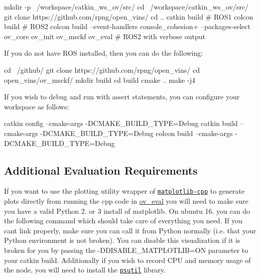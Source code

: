 \begin{DoxyCode}
mkdir -p ~/workspace/catkin\_ws\_ov/src/
cd ~/workspace/catkin\_ws\_ov/src/
git clone https://github.com/rpng/open\_vins/
cd ..
catkin build # ROS1
colcon build # ROS2
colcon build --event-handlers console\_cohesion+ --packages-select ov\_core ov\_init ov\_msckf ov\_eval # ROS2
       with verbose output
\end{DoxyCode}


If you do not have R\+OS installed, then you can do the following\+:


\begin{DoxyCode}
cd ~/github/
git clone https://github.com/rpng/open\_vins/
cd open\_vins/ov\_msckf/
mkdir build
cd build
cmake ..
make -j4
\end{DoxyCode}


If you wish to debug and run with assert statements, you can configure your workspace as follows\+:


\begin{DoxyCode}
catkin config --cmake-args -DCMAKE\_BUILD\_TYPE=Debug
catkin build --cmake-args -DCMAKE\_BUILD\_TYPE=Debug
colcon build --cmake-args -DCMAKE\_BUILD\_TYPE=Debug
\end{DoxyCode}
\hypertarget{gs-installing_gs-install-oveval}{}\subsection{Additional Evaluation Requirements}\label{gs-installing_gs-install-oveval}
If you want to use the plotting utility wrapper of \href{https://github.com/lava/matplotlib-cpp}{\tt matplotlib-\/cpp} to generate plots directly from running the cpp code in \hyperlink{namespaceov__eval}{ov\+\_\+eval} you will need to make sure you have a valid Python 2. or 3 install of matplotlib. On ubuntu 16. you can do the following command which should take care of everything you need. If you can\textquotesingle{}t link properly, make sure you can call it from Python normally (i.\+e. that your Python environment is not broken). You can disable this visualization if it is broken for you by passing the -\/\+D\+D\+I\+S\+A\+B\+L\+E\+\_\+\+M\+A\+T\+P\+L\+O\+T\+L\+IB=ON parameter to your catkin build. Additionally if you wish to record C\+PU and memory usage of the node, you will need to install the \href{https://github.com/giampaolo/psutil}{\tt psutil} library.


